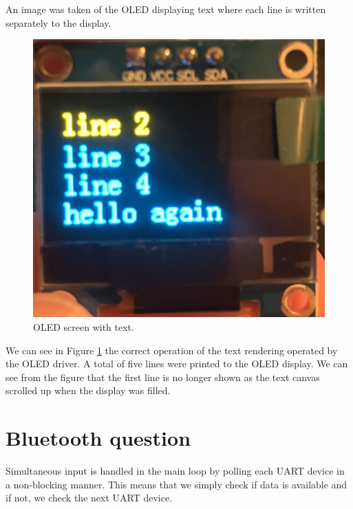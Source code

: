 \documentclass[CMPE]{../KGCOEReport}
\begin{document}
	An image was taken of the OLED displaying text where each line is written separately
	to the display.

	\begin{figure}[ht]
	  \centering
	  \includegraphics[width=.4\linewidth]{i2c}
	  \caption{OLED screen with text.}
	  \label{fig:oled}
	\end{figure}

	We can see in Figure \ref{fig:oled} the correct operation of the text rendering
	operated by the OLED driver. A total of five lines were printed to the OLED display.
	We can see from the figure that the first line is no longer shown as the text canvas
	scrolled up when the display was filled.

	\section*{Bluetooth question}

	Simultaneous input is handled in the main loop by polling each UART device in a
	non-blocking manner. This means that we simply check if data is available and if
	not, we check the next UART device.


\end{document}
